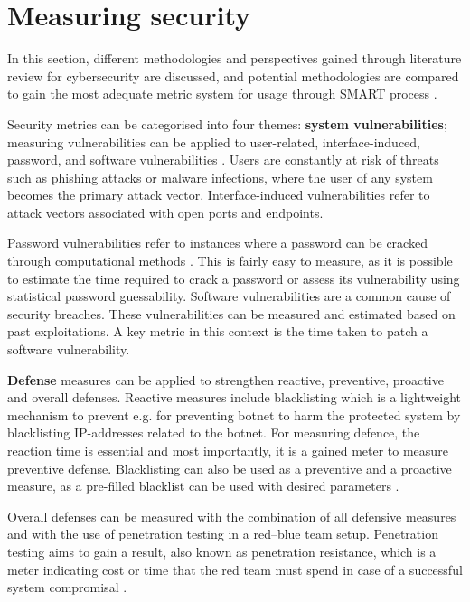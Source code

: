 \section{Measuring security} \label{measuringsecurity}

In this section, different methodologies and perspectives gained
through literature review for cybersecurity are discussed, and
potential methodologies are compared to gain the most adequate metric
system for usage through SMART process \cite{payne2006guide}.

Security metrics can be categorised into four themes:
\textbf{system vulnerabilities}; measuring vulnerabilities can be
applied to user-related, interface-induced, password, and software
vulnerabilities \cite{pendleton2016survey}. Users are constantly at risk of threats such as
phishing attacks or malware infections, where the user of any system
becomes the primary attack vector. Interface-induced vulnerabilities refer to attack vectors associated with open ports
and endpoints.

Password vulnerabilities refer to instances where a password can be
cracked through computational methods \cite{pendleton2016survey}. This is fairly easy to measure,
as it is possible to estimate the time required to crack a password or
assess its vulnerability using statistical password
guessability. Software vulnerabilities are a common cause of security
breaches. These vulnerabilities can be measured and estimated based on
past exploitations. A key metric in this context is the time taken to
patch a software vulnerability. 

\textbf{Defense} measures can be applied to strengthen reactive,
preventive, proactive and overall defenses. Reactive measures include
blacklisting which is a lightweight mechanism to prevent e.g. for preventing botnet to harm
the protected system by blacklisting IP-addresses related to the
botnet. For measuring defence, the reaction time is essential and
most importantly, it is a gained meter to measure preventive
defense. Blacklisting can also be used as a preventive and a proactive
measure, as a pre-filled blacklist can be used with desired
parameters \cite{pendleton2016survey, ramos2017model}.

Overall defenses can be measured with the combination of all defensive
measures and with the use of penetration testing in a red–blue team
setup. Penetration testing aims to gain a result, also known as
penetration resistance, which is a meter indicating cost or time that
the red team must spend in case of a successful system
compromisal \cite{pendleton2016survey, ramos2017model}.

